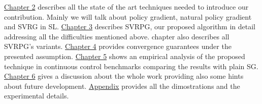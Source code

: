 \hyperref[chap:art]{Chapter 2} describes all the state of the art techniques needed to introduce our contribution. Mainly we will talk about policy gradient, natural policy gradient and \acs{SVRG} in \acs{SL}.\newline
\hyperref[chap:art]{Chapter 3} describes \acs{SVRPG}, our proposed algorithm in detail addressing all the difficulties mentioned above. chapter also describes all \acs{SVRPG}'s variants.\newline
\hyperref[chap:art]{Chapter 4} provides convergence guarantees under the presented assumption.\newline
\hyperref[chap:art]{Chapter 5} shows an empirical analysis of the proposed technique in continuous control benchmarks comparing the results with plain \acs{SG}.\newline
\hyperref[chap:art]{Chapter 6} gives a discussion about the whole work providing also some hints about future development.\newline
\hyperref[chap:art]{Appendix} provides all the dimostrations and the experimental details.
